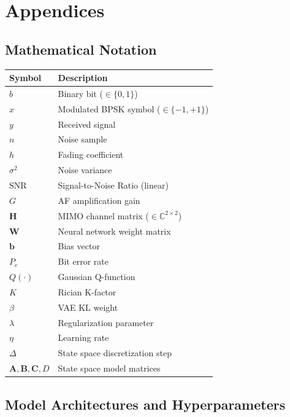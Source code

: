 \chapter{Appendices}\label{chap:appendices}\label{chap:app-experiments}

\section{Mathematical Notation}\label{sec:appendix-a-mathematical-notation}

{\def\LTcaptype{table} %
\begin{longtable}[]{@{}ll@{}}
\toprule\noalign{}
Symbol & Description \\
\midrule\noalign{}
\endhead
\bottomrule\noalign{}
\endlastfoot
\(b\) & Binary bit (\(\in \{0, 1\}\)) \\
\(x\) & Modulated BPSK symbol (\(\in \{-1, +1\}\)) \\
\(y\) & Received signal \\
\(n\) & Noise sample \\
\(h\) & Fading coefficient \\
\(\sigma^2\) & Noise variance \\
\(\text{SNR}\) & Signal-to-Noise Ratio (linear) \\
\(G\) & AF amplification gain \\
\(\mathbf{H}\) & MIMO channel matrix (\(\in \mathbb{C}^{2 \times 2}\)) \\
\(\mathbf{W}\) & Neural network weight matrix \\
\(\mathbf{b}\) & Bias vector \\
\(P_e\) & Bit error rate \\
\(Q(\cdot)\) & Gaussian Q-function \\
\(K\) & Rician K-factor \\
\(\beta\) & VAE KL weight \\
\(\lambda\) & Regularization parameter \\
\(\eta\) & Learning rate \\
\(\Delta\) & State space discretization step \\
\(\mathbf{A}, \mathbf{B}, \mathbf{C}, D\) & State space model matrices \\
\end{longtable}
}

\section{Model Architectures and Hyperparameters}\label{sec:appendix-b-model-architectures-and-hyperparameters}

